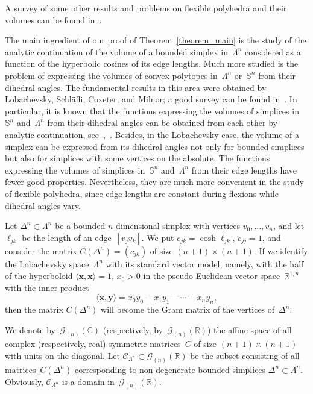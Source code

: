 \documentclass[reqno,tbtags,12pt]{amsart}
\numberwithin{equation}{section}
\newcommand{\R}{\mathbb{R}}
\newcommand{\CC}{\mathcal{C}}
\newcommand{\C}{\mathbb{C}}
\newcommand{\bS}{\mathbb{S}}
\newcommand{\CG}{\mathcal{G}}
\newcommand{\bx}{\mathbf{x}}
\newcommand{\by}{\mathbf{y}}
\theoremstyle{definition}
\begin{document}
A survey of some other results and problems on flexible polyhedra and their volumes can be found in~\cite{Sab11}.





The main ingredient of  our proof of Theorem~\ref{theorem_main} is  the study of the analytic continuation of the volume of a bounded simplex in~$\Lambda^n$ considered as a function of the hyperbolic cosines of its edge lengths. Much more studied is the problem of expressing the volumes of convex polytopes in~$\Lambda^n$ or~$\bS^n$ from their dihedral angles. The fundamental results in this area were obtained by Lobachevsky, Schl\"afli, Coxeter, and Milnor; a good survey can be found in~\cite[Ch. 7]{AVS88}. In particular, it is known that the functions expressing the volumes of simplices in~$\bS^n$ and~$\Lambda^n$ from their dihedral angles can be obtained from each other by analytic continuation, see~\cite{Cox35},~\cite{Aom77}. Besides, in the Lobachevsky case, the volume of a simplex can be expressed from its dihedral angles not only for bounded simplices but also for simplices with some vertices on the absolute. The functions expressing the volumes of simplices in~$\bS^n$ and~$\Lambda^n$ from their edge lengths have fewer good properties. Nevertheless, they are much more convenient in the study of flexible polyhedra, since  edge lengths are constant during flexions while  dihedral angles vary.



Let $\Delta^n\subset\Lambda^n$ be a bounded $n$-dimensional simplex with vertices $v_0,\ldots,v_n$, and let $\ell_{jk}$ be the length of an edge~$[v_{j}v_k]$. We put $c_{jk}=\cosh\ell_{jk}$, $c_{jj}=1$, and consider the matrix $C(\Delta^n)=(c_{jk})$ of size $(n+1)\times(n+1)$. If we identify the Lobachevsky space~$\Lambda^n$ with its standard vector model, namely, with the half of the hyperboloid $\langle\bx,\bx\rangle=1$, $x_0>0$ in the pseudo-Euclidean vector space~$\R^{1,n}$ with the inner product
$$
\langle\bx,\by\rangle=x_0y_0-x_1y_1-\cdots-x_ny_n,
$$
then the matrix $C(\Delta^n)$ will become the Gram matrix of the vertices of~$\Delta^n$.


We denote by~$\CG_{(n)}(\C)$ (respectively, by~$\CG_{(n)}(\R)$) the affine space of all complex (respectively, real) symmetric  matrices~$C$ of size $(n+1)\times(n+1)$ with units on the diagonal. Let $\CC_{\Lambda^n}\subset\CG_{(n)}(\R)$ be the subset consisting of all matrices~$C(\Delta^n)$ corresponding to non-degenerate bounded simplices $\Delta^n\subset\Lambda^n$. Obviously, $\CC_{\Lambda^n}$ is a domain in~$\CG_{(n)}(\R)$.
\end{document}
